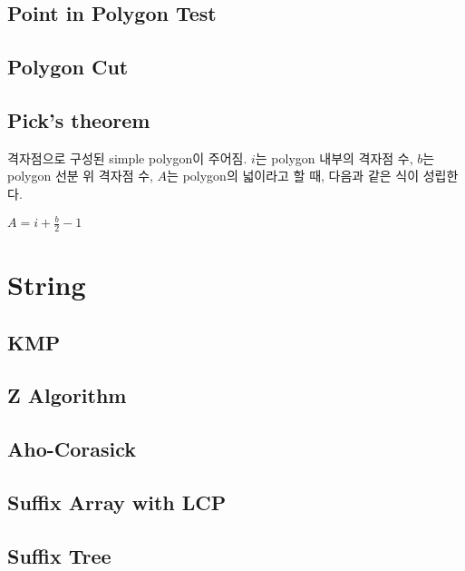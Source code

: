 \documentclass[10pt,landscape,a4paper,twocolumn]{article}
\begin{document}
\subsection{Point in Polygon Test}


\subsection{Polygon Cut}


\subsection{Pick's theorem}

격자점으로 구성된 simple polygon이 주어짐. $i$는 polygon 내부의 격자점 수, $b$는 polygon 선분 위 격자점 수, $A$는 polygon의 넓이라고 할 때, 다음과 같은 식이 성립한다.

$A = i + \frac{b}{2} - 1$

\section{String}

\subsection{KMP}


\subsection{Z Algorithm}


\subsection{Aho-Corasick}


\subsection{Suffix Array with LCP}


\subsection{Suffix Tree}
\end{document}
